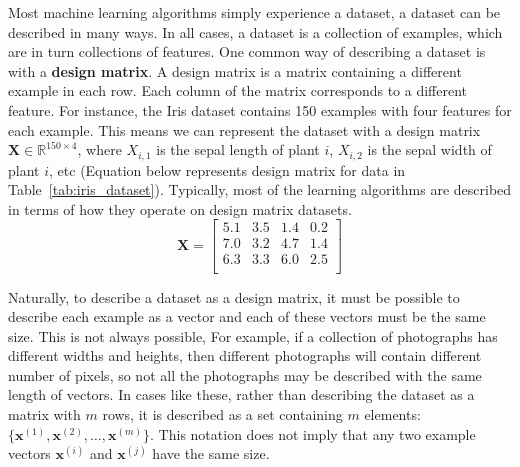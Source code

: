 Most machine learning algorithms simply experience a dataset, a dataset can be
described in many ways. In all cases, a dataset is a collection of examples,
which are in turn collections of features. One common way of describing a
dataset is with a \textbf{design matrix}. A design matrix is a matrix
containing a different example in each row. Each column of the matrix
corresponds to a different feature. For instance, the Iris dataset
contains 150 examples with four features for each example. This means we can
represent the dataset with a design matrix $\boldsymbol{X} \in \mathbb{R}^{150
\times 4}$, where $X_{i,1}$ is the sepal length of plant $i$, $X_{i,2}$ is the
sepal width of plant $i$, etc (Equation below represents design matrix for data
in Table~\ref{tab:iris_dataset}). Typically, most of the learning algorithms
are described in terms of how they operate on design matrix datasets.
\begin{equation*}
    \label{eq:iris_matrix}
    \boldsymbol{X} = \left[
        \begin{matrix}
        5.1 & 3.5 & 1.4 & 0.2 \\
        7.0 & 3.2 & 4.7 & 1.4 \\
        6.3 & 3.3 & 6.0 & 2.5 \\
        \end{matrix}
        \right]
\end{equation*}


Naturally, to describe a dataset as a design matrix, it must be possible to
describe each example as a vector and each of these vectors must be the same
size. This is not always possible, For example, if a collection of photographs
has different widths and heights, then different photographs will contain
different number of pixels, so not all the photographs may be described with
the same length of vectors. In cases like these, rather than describing the
dataset as a matrix with $m$ rows, it is described as a set containing $m$
elements: $\{ \boldsymbol{x}^{(1)}, \boldsymbol{x}^{(2)}, \dots,
\boldsymbol{x}^{(m)} \}$.
This notation does not imply that any two example vectors
$\boldsymbol{x}^{(i)}$ and $\boldsymbol{x}^{(j)}$ have the same size.


